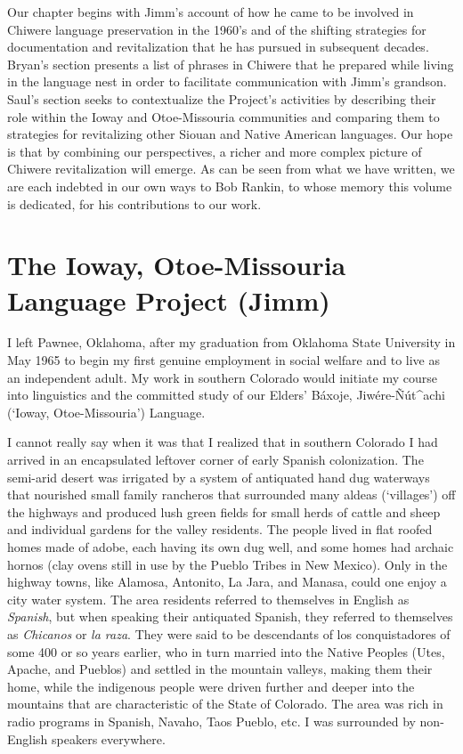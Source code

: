 \documentclass[output=paper]{LSP/langsci}
\begin{document}
Our chapter begins with Jimm's account of how he came to be involved in Chiwere language preservation in the 1960's and of the shifting strategies for documentation and revitalization that he has pursued in subsequent decades. Bryan's section presents a list of phrases in Chiwere that he prepared while living in the language nest in order to facilitate communication with Jimm's grandson. Saul's section seeks to contextualize the Project's activities by describing their role within the Ioway and Otoe-Missouria communities and comparing them to strategies for revitalizing other Siouan and Native American languages. Our hope is that by combining our perspectives, a richer and more complex picture of Chiwere revitalization will emerge. As can be seen from what we have written, we are each indebted in our own ways to Bob Rankin, to whose memory this volume is dedicated, for his contributions to our work.

\section{The Ioway, Otoe-Missouria Language Project (Jimm)}
I left Pawnee, Oklahoma, after my graduation from Oklahoma State University in May 1965 to begin my first genuine employment in social welfare and to live as an independent adult. My work in southern Colorado would initiate my course into linguistics and the committed study of our Elders' Báxoje, Jiwére-\~Nút\^{ }achi (`Ioway, Otoe-Mis\-sou\-ria') Language.

I cannot really say when it was that I realized that in southern Colorado I had arrived in an encapsulated leftover corner of early Spanish colonization. The semi-arid desert was irrigated by a system of antiquated hand dug waterways that nourished small family rancheros that surrounded many aldeas (`villages') off the highways and produced lush green fields for small herds of cattle and sheep and individual gardens for the valley residents. The people lived in flat roofed homes made of adobe, each having its own dug well, and some homes had archaic hornos (clay ovens still in use by the Pueblo Tribes in New Mexico). Only in the highway towns, like Alamosa, Antonito, La Jara, and Manasa, could one enjoy a city water system. The area residents referred to themselves in English as \emph{Spanish}, but when speaking their antiquated Spanish, they referred to themselves as \emph{Chicanos} or \emph{la raza}. They were said to be descendants of los conquistadores of some 400 or so years earlier, who in turn married into the Native Peoples (Utes, Apache, and Pueblos) and settled in the mountain valleys, making them their home, while the indigenous people were driven further and deeper into the mountains that are characteristic of the State of Colorado. The area was rich in radio programs in Spanish, Navaho, Taos Pueblo, etc. I was surrounded by non-English speakers everywhere.
\end{document}
